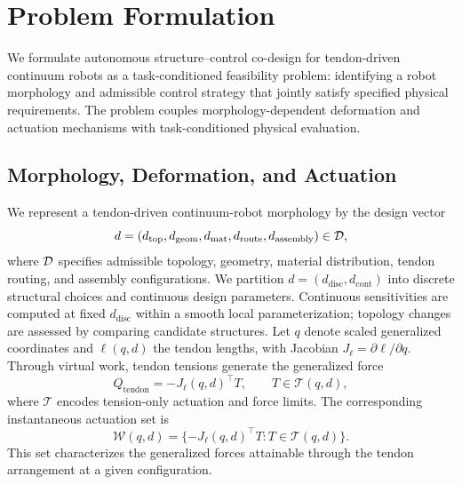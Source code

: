 \section{Problem Formulation}
\label{sec:formulation}

We formulate autonomous structure--control co-design for tendon-driven continuum robots as a task-conditioned feasibility problem: identifying a robot morphology and admissible control strategy that jointly satisfy specified physical requirements. The problem couples morphology-dependent deformation and actuation mechanisms with task-conditioned physical evaluation.

\subsection{Morphology, Deformation, and Actuation}

We represent a tendon-driven continuum-robot morphology by the design vector
\begin{equation}
d=(d_{\mathrm{top}},d_{\mathrm{geom}},d_{\mathrm{mat}},d_{\mathrm{route}},d_{\mathrm{assembly}})\in\mathcal{D},
\label{eq:design}
\end{equation}
where $\mathcal{D}$ specifies admissible topology, geometry, material distribution, tendon routing, and assembly configurations. We partition $d=(d_{\mathrm{disc}},d_{\mathrm{cont}})$ into discrete structural choices and continuous design parameters. Continuous sensitivities are computed at fixed $d_{\mathrm{disc}}$ within a smooth local parameterization; topology changes are assessed by comparing candidate structures. Let $q$ denote scaled generalized coordinates and $\ell(q,d)$ the tendon lengths, with Jacobian $J_\ell=\partial\ell/\partial q$. Through virtual work, tendon tensions generate the generalized force
\begin{equation}
Q_{\mathrm{tendon}}=-J_\ell(q,d)^\top T,\qquad T\in\mathcal T(q,d),
\label{eq:tendon-force}
\end{equation}
where $\mathcal T$ encodes tension-only actuation and force limits. The corresponding instantaneous actuation set is
\begin{equation}
\mathcal W(q,d)=\{-J_\ell(q,d)^\top T:T\in\mathcal T(q,d)\}.
\label{eq:actuation-set}
\end{equation}
This set characterizes the generalized forces attainable through the tendon arrangement at a given configuration.

